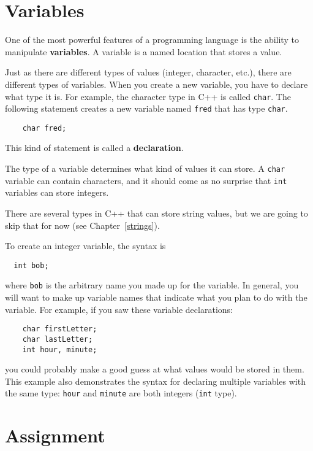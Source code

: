 \section {Variables}

One of the most powerful features of a programming language is the
ability to manipulate {\bf variables}.  A variable is a named location
that stores a value.  

Just as there are different types of values (integer, character,
etc.), there are different types of variables.  When you create a new
variable, you have to declare what type it is.  For example, the
character type in C++ is called {\tt char}.  The following statement
creates a new variable named {\tt fred} that has type {\tt char}.

\begin{verbatim}
    char fred;
\end{verbatim}
%
This kind of statement is called a {\bf declaration}.

The type of a variable determines what kind of values it can
store.  A {\tt char} variable can contain characters, and it should
come as no surprise that {\tt int} variables can store integers.

There are several types in C++ that can store string values, but we
are going to skip that for now (see Chapter~\ref{strings}).


To create an integer variable, the syntax is 

\begin{verbatim}
  int bob;
\end{verbatim}
%
where {\tt bob} is the arbitrary name you made up for the
variable.  In general, you will want to make up variable names
that indicate what you plan to do with the variable.  For
example, if you saw these variable declarations:

\begin{verbatim}
    char firstLetter;
    char lastLetter;
    int hour, minute;
\end{verbatim}
%
you could probably make a good guess at what values
would be stored in them.  This example
also demonstrates the syntax for declaring multiple variables
with the same type: {\tt hour} and {\tt minute}
are both integers ({\tt int} type).

\section{Assignment}

